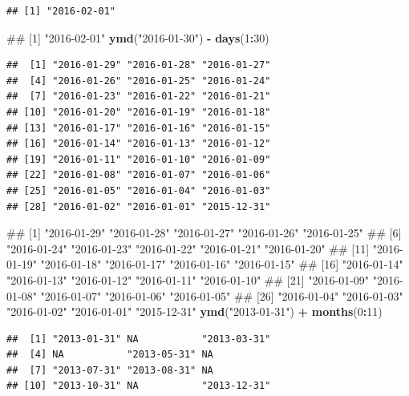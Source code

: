 \documentclass[10pt,]{krantz}
\makeatletter
\newenvironment{Shaded}{\begin{snugshade}}{\end{snugshade}}
\newcommand{\KeywordTok}[1]{\textcolor[rgb]{0.13,0.29,0.53}{\textbf{#1}}}
\newcommand{\DecValTok}[1]{\textcolor[rgb]{0.00,0.00,0.81}{#1}}
\newcommand{\StringTok}[1]{\textcolor[rgb]{0.31,0.60,0.02}{#1}}
\newcommand{\CommentTok}[1]{\textcolor[rgb]{0.56,0.35,0.01}{\textit{#1}}}
\newcommand{\OperatorTok}[1]{\textcolor[rgb]{0.81,0.36,0.00}{\textbf{#1}}}
\newcommand{\NormalTok}[1]{#1}
\newenvironment{kframe}{%
\medskip{}
\setlength{\fboxsep}{.8em}
 \def\at@end@of@kframe{}%
 \ifinner\ifhmode%
  \def\at@end@of@kframe{\end{minipage}}%
  \begin{minipage}{\columnwidth}%
 \fi\fi%
 \def\FrameCommand##1{\hskip\@totalleftmargin \hskip-\fboxsep
 \colorbox{shadecolor}{##1}\hskip-\fboxsep
     \hskip-\linewidth \hskip-\@totalleftmargin \hskip\columnwidth}%
 \MakeFramed {\advance\hsize-\width
   \@totalleftmargin\z@ \linewidth\hsize
   \@setminipage}}%
 {\par\unskip\endMakeFramed%
 \at@end@of@kframe}
\renewenvironment{Shaded}{\begin{kframe}}{\end{kframe}}
\makeatother
\begin{document}
\begin{verbatim}
## [1] "2016-02-01"
\end{verbatim}

\begin{Shaded}
\begin{Highlighting}[]
\NormalTok{## [1] "2016-02-01"}
\KeywordTok{ymd}\NormalTok{(}\StringTok{"2016-01-30"}\NormalTok{) }\OperatorTok{-}\StringTok{ }\KeywordTok{days}\NormalTok{(}\DecValTok{1}\OperatorTok{:}\DecValTok{30}\NormalTok{)}
\end{Highlighting}
\end{Shaded}

\begin{verbatim}
##  [1] "2016-01-29" "2016-01-28" "2016-01-27"
##  [4] "2016-01-26" "2016-01-25" "2016-01-24"
##  [7] "2016-01-23" "2016-01-22" "2016-01-21"
## [10] "2016-01-20" "2016-01-19" "2016-01-18"
## [13] "2016-01-17" "2016-01-16" "2016-01-15"
## [16] "2016-01-14" "2016-01-13" "2016-01-12"
## [19] "2016-01-11" "2016-01-10" "2016-01-09"
## [22] "2016-01-08" "2016-01-07" "2016-01-06"
## [25] "2016-01-05" "2016-01-04" "2016-01-03"
## [28] "2016-01-02" "2016-01-01" "2015-12-31"
\end{verbatim}

\begin{Shaded}
\begin{Highlighting}[]
\NormalTok{##  [1] "2016-01-29" "2016-01-28" "2016-01-27" "2016-01-26" "2016-01-25"}
\NormalTok{##  [6] "2016-01-24" "2016-01-23" "2016-01-22" "2016-01-21" "2016-01-20"}
\NormalTok{## [11] "2016-01-19" "2016-01-18" "2016-01-17" "2016-01-16" "2016-01-15"}
\NormalTok{## [16] "2016-01-14" "2016-01-13" "2016-01-12" "2016-01-11" "2016-01-10"}
\NormalTok{## [21] "2016-01-09" "2016-01-08" "2016-01-07" "2016-01-06" "2016-01-05"}
\NormalTok{## [26] "2016-01-04" "2016-01-03" "2016-01-02" "2016-01-01" "2015-12-31"}
\KeywordTok{ymd}\NormalTok{(}\StringTok{"2013-01-31"}\NormalTok{) }\OperatorTok{+}\StringTok{ }\KeywordTok{months}\NormalTok{(}\DecValTok{0}\OperatorTok{:}\DecValTok{11}\NormalTok{)}
\end{Highlighting}
\end{Shaded}

\begin{verbatim}
##  [1] "2013-01-31" NA           "2013-03-31"
##  [4] NA           "2013-05-31" NA          
##  [7] "2013-07-31" "2013-08-31" NA          
## [10] "2013-10-31" NA           "2013-12-31"
\end{verbatim}

\begin{Shaded}
\end{Shaded}
\end{document}
